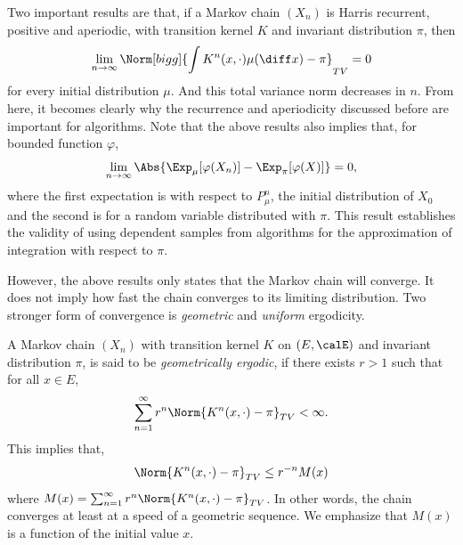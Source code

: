 Two important results are that, if a Markov chain $(X_n)$ is Harris recurrent,
positive and aperiodic, with transition kernel $K$ and invariant distribution
$\pi$, then
\begin{equation}
  \lim_{n\to\infty}\Norm[bigg]{
    \int K^n(x,\cdot)\mu(\diff x) - \pi}_{TV} = 0
\end{equation}
for every initial distribution $\mu$. And this total variance norm decreases
in $n$. From here, it becomes clearly why the recurrence and aperiodicity
discussed before are important for \mcmc algorithms. Note that the above
results also implies that, for bounded function $\varphi$,
\begin{equation}
  \lim_{n\to\infty}\Abs{\Exp_{\mu}[\varphi(X_n)] - \Exp_{\pi}[\varphi(X)]}
  = 0,
\end{equation}
where the first expectation is with respect to $P_{\mu}^n$, the initial
distribution of $X_0$ and the second is for a random variable distributed with
$\pi$. This result establishes the validity of using dependent samples from
\mcmc algorithms for the approximation of integration with respect to $\pi$.

However, the above results only states that the Markov chain will converge. It
does not imply how fast the chain converges to its limiting distribution. Two
stronger form of convergence is \emph{geometric} and \emph{uniform}
ergodicity.

A Markov chain $(X_n)$ with transition kernel $K$ on $(E,\calE)$ and invariant
distribution $\pi$, is said to be \emph{geometrically ergodic}, if there
exists $r > 1$ such that for all $x\in E$,
\begin{equation}
  \sum_{n=1}^{\infty} r^n\Norm{K^n(x,\cdot)-\pi}_{TV} <\infty.
\end{equation}
This implies that,
\begin{equation}
  \Norm{K^n(x,\cdot)-\pi}_{TV}\le r^{-n}M(x)
\end{equation}
where $M(x) = \sum_{n=1}^{\infty} r^n\Norm{K^n(x,\cdot)-\pi}_{TV}$. In other
words, the chain converges at least at a speed of a geometric sequence. We
emphasize that $M(x)$ is a function of the initial value $x$.


